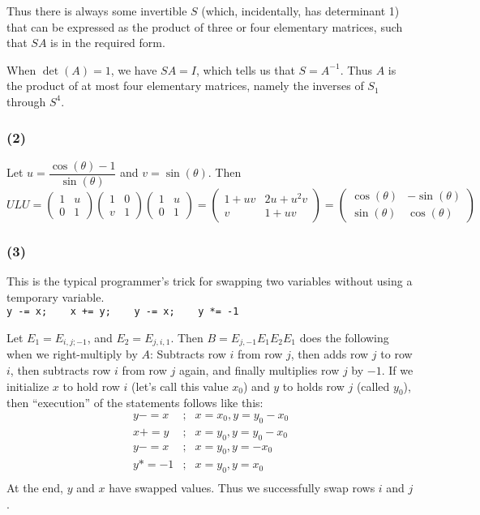 \documentclass{article}
\begin{document}
Thus there is always some invertible $S$ (which, incidentally, has determinant
1) that can be expressed as the product of three or four elementary matrices,
such that $SA$ is in the required form.

When $\det(A) = 1$, we have $SA = I$, which tells us that $S = A^{-1}$.
Thus $A$ is the product of at most four elementary matrices, namely the inverses
of $S_1$ through $S^4$.

\subsubsection{(2)}
Let $u = \dfrac{\cos(\theta) - 1}{\sin(\theta)}$ and $v = \sin(\theta)$.
Then 
\[
ULU = 
\left(
\begin{array}{cc}
  1 & u \\
  0 & 1
\end{array}
\right)
\left(
\begin{array}{cc}
  1 & 0 \\
  v & 1
\end{array}
\right)
\left(
\begin{array}{cc}
  1 & u \\
  0 & 1
\end{array}
\right)
= 
\left(
\begin{array}{cc}
  1 + uv & 2u + u^2v \\
  v & 1 + uv
\end{array}
\right)
=
\left(
\begin{array}{cc}
  \cos(\theta) & -\sin(\theta) \\
  \sin(\theta) & \cos(\theta)
\end{array}
\right)
\]

\subsubsection{(3)}
This is the typical programmer's trick for swapping two variables without using
a temporary variable.\\
\verb|y -= x;    x += y;    y -= x;    y *= -1|

Let $E_1 = E_{i,j;-1}$, and $E_2 = E_{j,i,1}$.
Then $B = E_{j,-1} E_1 E_2 E_1$ does the following when we right-multiply by
$A$:
Subtracts row $i$ from row $j$, then adds row $j$ to row $i$, then subtracts row
$i$ from row $j$ again, and finally multiplies row $j$ by $-1$.
If we initialize $x$ to hold row $i$ (let's call this value $x_0$)
and $y$ to holds row $j$ (called $y_0$), then ``execution'' of the statements
follows like this:
\begin{eqnarray*}
y -= x &;&  x = x_0, y = y_0 - x_0 \\
x += y &;& x = y_0, y = y_0 - x_0\\
y -= x &;& x = y_0, y = - x_0\\
y *= -1 &;& x = y_0, y = x_0\\
\end{eqnarray*}
At the end, $y$ and $x$ have swapped values.
Thus we successfully swap rows $i$ and $j$.
\end{document}

